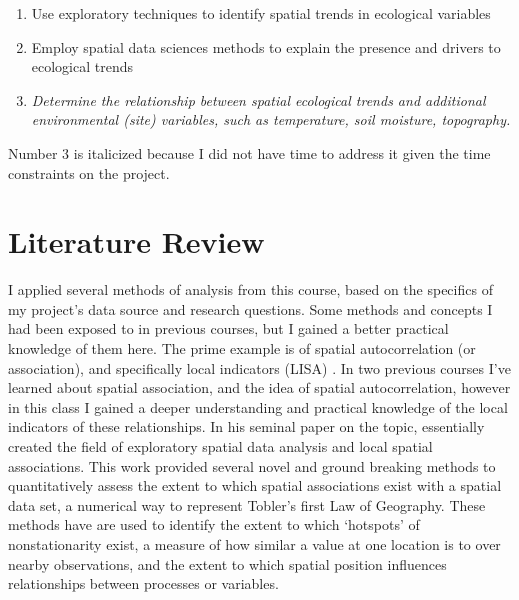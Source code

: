 \documentclass[12pt,a4paper]{article}
\begin{document}
\begin{enumerate}

\item Use exploratory techniques to identify spatial trends in ecological variables
\item Employ spatial data sciences methods to explain the presence and drivers to ecological trends
\item \textit{Determine the relationship between spatial ecological trends and additional environmental (site) variables, such as temperature, soil moisture, topography.}

\end{enumerate}

Number 3 is italicized because I did not have time to address it given the time constraints on the project.

\section{Literature Review}

I applied several methods of analysis from this course, based on the specifics of my project's data source and research questions.  Some methods and concepts I had been exposed to in previous courses, but I gained a better practical knowledge of them here.  The prime example is of spatial autocorrelation (or association), and specifically local indicators (LISA) \citep{anselin1995,symanzik2014exploratory}.  In two previous courses I've learned about spatial association, and the idea of spatial autocorrelation, however in this class I gained a deeper understanding and practical knowledge of the local indicators of these relationships.  In his seminal paper on the topic, \cite{anselin1995} essentially created the field of exploratory spatial data analysis and local spatial associations.  This work provided several novel and ground breaking methods to quantitatively assess the extent to which spatial associations exist with a spatial data set, a numerical way to represent Tobler's first Law of Geography.  These methods have are used to identify the extent to which `hotspots' of nonstationarity exist, a measure of how similar a value at one location is to over nearby observations, and the extent to which spatial position influences relationships between processes or variables.  
\end{document}
